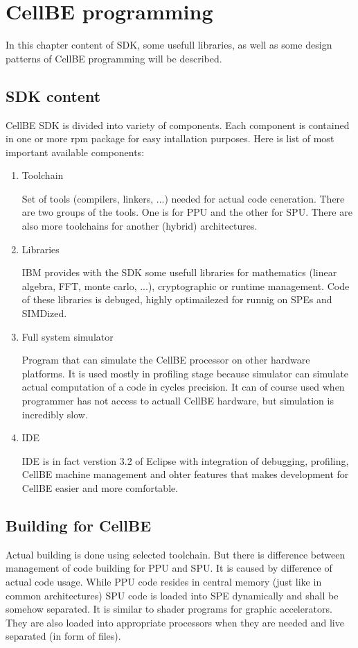 \chapter {CellBE programming} 

In this chapter content of SDK, some usefull libraries, as well as some design patterns of CellBE programming will be described.

\section {SDK content}

CellBE SDK is divided into variety of components. Each component is contained in one or more rpm package for easy intallation purposes. Here is list of most important available components:
\begin{enumerate}
  \item {Toolchain}
  \par
  Set of tools (compilers, linkers, ...) needed for actual code ceneration. There are two groups of the tools. One is for PPU and the other for SPU. There are also more toolchains for another (hybrid) architectures.

  \item {Libraries}
  \par
  IBM provides with the SDK some usefull libraries for mathematics (linear algebra, FFT, monte carlo, ...), cryptographic or runtime management. Code of these libraries is debuged, highly optimailezed for runnig on SPEs and SIMDized.

  \item {Full system simulator}
  \par
  Program that can simulate the CellBE processor on other hardware platforms. It is used mostly in profiling stage because simulator can simulate actual computation of a code in cycles precision. It can of course used when programmer has not access to actuall CellBE hardware, but simulation is incredibly slow.

  \item {IDE}
  \par
  IDE is in fact verstion 3.2 of Eclipse with integration of debugging, profiling, CellBE machine management and ohter features that makes development for CellBE easier and more comfortable.
\end{enumerate}

\section {Building for CellBE}
\par
Actual building is done using selected toolchain. But there is difference between management of code building for PPU and SPU. It is caused by difference of actual code usage. While PPU code resides in central memory (just like in common architectures) SPU code is loaded into SPE dynamically and shall be somehow separated. It is similar to shader programs for graphic accelerators. They are also loaded into appropriate processors when they are needed and live separated (in form of files).

